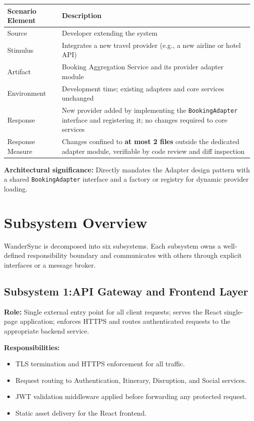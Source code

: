 \documentclass[12pt,a4paper]{article}
\begin{document}
\begin{tabularx}{\textwidth}{L{3.5cm}X}
\toprule
\textbf{Scenario Element} & \textbf{Description} \\
\midrule
Source            & Developer extending the system \\
Stimulus          & Integrates a new travel provider (e.g., a new airline or hotel API) \\
Artifact          & Booking Aggregation Service and its provider adapter module \\
Environment       & Development time; existing adapters and core services unchanged \\
Response          & New provider added by implementing the \texttt{BookingAdapter} interface and
                    registering it; no changes required to core services \\
Response Measure  & Changes confined to \textbf{at most 2 files} outside the dedicated adapter
                    module, verifiable by code review and diff inspection \\
\bottomrule
\end{tabularx}

\textbf{Architectural significance:} Directly mandates the Adapter design pattern with a shared
\texttt{BookingAdapter} interface and a factory or registry for dynamic provider loading.

\section{Subsystem Overview}

WanderSync is decomposed into six subsystems. Each subsystem owns a well-defined responsibility
boundary and communicates with others through explicit interfaces or a message broker.

\subsection{Subsystem 1:API Gateway and Frontend Layer}

\textbf{Role:} Single external entry point for all client requests; serves the React single-page
application; enforces HTTPS and routes authenticated requests to the appropriate backend service.

\textbf{Responsibilities:}
\begin{itemize}[noitemsep]
  \item TLS termination and HTTPS enforcement for all traffic.
  \item Request routing to Authentication, Itinerary, Disruption, and Social services.
  \item JWT validation middleware applied before forwarding any protected request.
  \item Static asset delivery for the React frontend.
\end{itemize}
\end{document}
